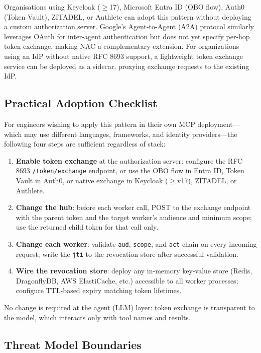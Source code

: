 \documentclass[journal]{IEEEtran}
\begin{document}
Organisations using Keycloak ($\geq$17), Microsoft Entra ID (OBO flow), Auth0
(Token Vault), ZITADEL, or Authlete can adopt this pattern without deploying a
custom authorization server. Google's Agent-to-Agent (A2A) protocol
\cite{google_a2a} similarly leverages OAuth for inter-agent authentication but
does not yet specify per-hop token exchange, making NAC a complementary
extension. For organizations using an IdP without native
RFC 8693 support, a lightweight token exchange service can be deployed as a
sidecar, proxying exchange requests to the existing IdP.

\subsection{Practical Adoption Checklist}

For engineers wishing to apply this pattern in their own MCP deployment---which
may use different languages, frameworks, and identity providers---the following
four steps are sufficient regardless of stack:

\begin{enumerate}
  \item \textbf{Enable token exchange} at the authorization server: configure
        the RFC 8693 \texttt{/token/exchange} endpoint, or use the OBO flow
        in Entra ID, Token Vault in Auth0, or native exchange in Keycloak
        ($\geq$v17), ZITADEL, or Authlete.
  \item \textbf{Change the hub}: before each worker call, POST to the exchange
        endpoint with the parent token and the target worker's audience and
        minimum scope; use the returned child token for that call only.
  \item \textbf{Change each worker}: validate \texttt{aud}, \texttt{scope},
        and \texttt{act} chain on every incoming request; write the \texttt{jti}
        to the revocation store after successful validation.
  \item \textbf{Wire the revocation store}: deploy any in-memory key-value store
        (Redis, DragonflyDB, AWS ElastiCache, etc.) accessible to all worker
        processes; configure TTL-based expiry matching token lifetimes.
\end{enumerate}

No change is required at the agent (LLM) layer: token exchange is transparent
to the model, which interacts only with tool names and results.

\subsection{Threat Model Boundaries}
\end{document}
